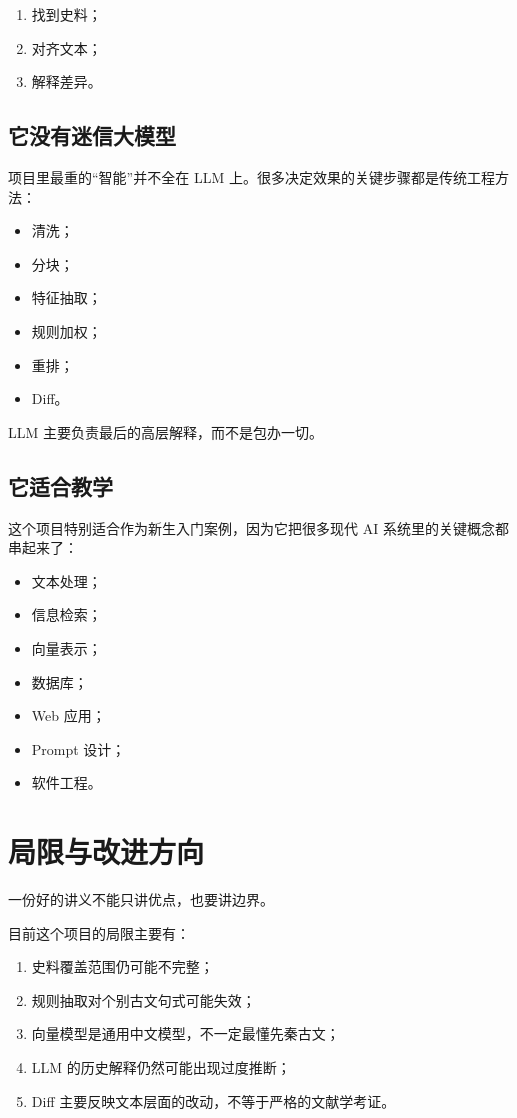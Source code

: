 \documentclass[12pt,a4paper]{ctexart}
\begin{document}
\begin{enumerate}
  \item 找到史料；
  \item 对齐文本；
  \item 解释差异。
\end{enumerate}

\subsection{它没有迷信大模型}

项目里最重的“智能”并不全在 LLM 上。很多决定效果的关键步骤都是传统工程方法：

\begin{itemize}
  \item 清洗；
  \item 分块；
  \item 特征抽取；
  \item 规则加权；
  \item 重排；
  \item Diff。
\end{itemize}

LLM 主要负责最后的高层解释，而不是包办一切。

\subsection{它适合教学}

这个项目特别适合作为新生入门案例，因为它把很多现代 AI 系统里的关键概念都串起来了：

\begin{itemize}
  \item 文本处理；
  \item 信息检索；
  \item 向量表示；
  \item 数据库；
  \item Web 应用；
  \item Prompt 设计；
  \item 软件工程。
\end{itemize}

\section{局限与改进方向}

一份好的讲义不能只讲优点，也要讲边界。

目前这个项目的局限主要有：

\begin{enumerate}
  \item 史料覆盖范围仍可能不完整；
  \item 规则抽取对个别古文句式可能失效；
  \item 向量模型是通用中文模型，不一定最懂先秦古文；
  \item LLM 的历史解释仍然可能出现过度推断；
  \item Diff 主要反映文本层面的改动，不等于严格的文献学考证。
\end{enumerate}
\end{document}
